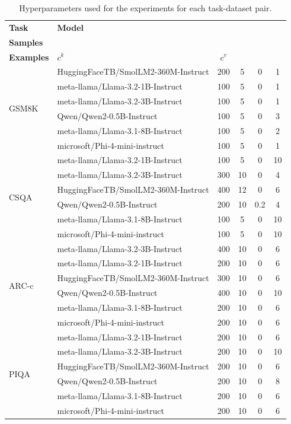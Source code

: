 \begin{table}[h!]
\centering
\caption{Hyperparameters used for the experiments for each task-dataset pair.}
\label{tab:contrastive_config_updated}
\begin{tabular}{llcccc}
\toprule
\textbf{Task} & \textbf{Model} &  \makecell{\textbf{Contrastive} \\ \textbf{Samples}} &  \makecell{\textbf{In-context} \\ \textbf{Examples}} & \textbf{\(c^k\)} & \textbf{\(c^v\)} \\
\midrule
\multirow{6}{*}{GSM8K} 
& HuggingFaceTB/SmolLM2-360M-Instruct & 200 & 5 & 0 & 1 \\
& meta-llama/Llama-3.2-1B-Instruct & 100 & 5 & 0 & 1 \\
& meta-llama/Llama-3.2-3B-Instruct & 100 & 5 & 0 & 1 \\
& Qwen/Qwen2-0.5B-Instruct & 100 & 5 & 0 & 3 \\
& meta-llama/Llama-3.1-8B-Instruct & 100 & 5 & 0 & 2 \\
& microsoft/Phi-4-mini-instruct & 100 & 5 & 0 & 1 \\
\midrule
\multirow{6}{*}{CSQA} 
& meta-llama/Llama-3.2-1B-Instruct & 100 & 5 & 0 & 10 \\
& meta-llama/Llama-3.2-3B-Instruct & 300 & 10 & 0 & 4 \\
& HuggingFaceTB/SmolLM2-360M-Instruct & 400 & 12 & 0 & 6 \\
& Qwen/Qwen2-0.5B-Instruct & 200 & 10 & 0.2 & 4 \\
& meta-llama/Llama-3.1-8B-Instruct & 100 & 5 & 0 & 10 \\
& microsoft/Phi-4-mini-instruct & 100 & 5 & 0 & 10 \\
\midrule
\multirow{6}{*}{ARC-c} 
& meta-llama/Llama-3.2-3B-Instruct & 400 & 10 & 0 & 6 \\
& meta-llama/Llama-3.2-1B-Instruct & 200 & 10 & 0 & 6 \\
& HuggingFaceTB/SmolLM2-360M-Instruct & 300 & 10 & 0 & 6 \\
& Qwen/Qwen2-0.5B-Instruct & 400 & 10 & 0 & 10 \\
& meta-llama/Llama-3.1-8B-Instruct & 200 & 10 & 0 & 6 \\
& microsoft/Phi-4-mini-instruct & 200 & 10 & 0 & 6 \\
\midrule
\multirow{6}{*}{PIQA} 
& meta-llama/Llama-3.2-1B-Instruct & 200 & 10 & 0 & 6 \\
& meta-llama/Llama-3.2-3B-Instruct & 200 & 10 & 0 & 10 \\
& HuggingFaceTB/SmolLM2-360M-Instruct & 200 & 10 & 0 & 6 \\
& Qwen/Qwen2-0.5B-Instruct & 200 & 10 & 0 & 8 \\
& meta-llama/Llama-3.1-8B-Instruct & 200 & 10 & 0 & 6 \\
& microsoft/Phi-4-mini-instruct & 200 & 10 & 0 & 6 \\
\bottomrule
\end{tabular}
\end{table}